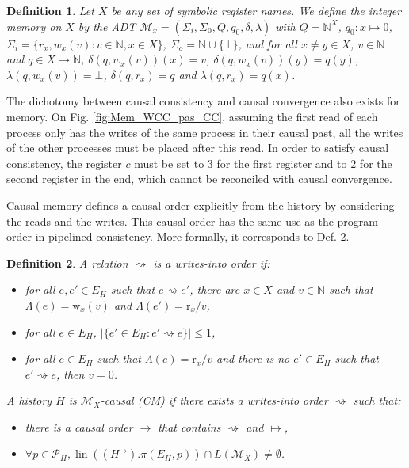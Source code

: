 \documentclass[9pt,numbers]{sigplanconf}
\newtheorem{definition}{Definition}
\DeclareMathOperator{\lin}{lin}
\begin{document}
\begin{definition}\label{def:mem}
  Let $X$ be any set of symbolic \emph{register names}. We define the integer \emph{memory} on $X$ by the ADT \linebreak
  $\mathcal{M}_x = (\Sigma_i, \Sigma_0, Q, q_0, \delta, \lambda)$ with $Q = \mathbb{N}^X$, $q_0 : x\mapsto 0$,
  $\Sigma_i = \{r_x, w_x(v) : v\in \mathbb{N}, x\in X\}$, 
  $\Sigma_o = \mathbb{N} \cup \{\bot\}$,  
  and for all $x\neq y\in X$, $v\in \mathbb{N}$ and $q\in X\rightarrow\mathbb{N}$,
  $\delta(q, w_x(v))(x) = v$, $\delta(q, w_x(v))(y) = q(y)$, $\lambda(q, w_x(v)) = \bot$, $\delta(q, r_x) = q$ and $\lambda(q, r_x) = q(x)$.
\end{definition}

The dichotomy between causal consistency and causal convergence also exists for memory. 
On Fig. \ref{fig:Mem_WCC_pas_CC}, assuming the first read of each process only has the writes of
the same process in their causal past, all the writes of the other processes must be placed after 
this read. In order to satisfy causal consistency, the register $c$ must be set to $3$ for the 
first register and to $2$ for the second register in the end, which cannot be reconciled with 
causal convergence.

Causal memory defines a causal order explicitly from the history by considering the reads and the writes. 
This causal order has the same use as the program order in pipelined consistency. More formally,
it corresponds to Def. \ref{def:CM}.

\begin{definition}\label{def:CM}
  A relation $\rightsquigarrow$ is a writes-into order if:
  \begin{itemize}
  \item for all $e, e'\in E_H$ such that $e \rightsquigarrow e'$, there are $x\in X$ and $v\in \mathbb{N}$ such that
    $\Lambda(e) = \mathrm{w}_x(v)$ and $\Lambda(e') = \mathrm{r}_x/v$,
  \item for all $e\in E_H$, $|\{e'\in E_H : e' \rightsquigarrow e\}| \le 1$,
  \item for all $e\in E_H$ such that $\Lambda(e) = \mathrm{r}_x/v$ and there is no $e'\in E_H$ such that $e'\rightsquigarrow e$,
    then $v = 0$.
  \end{itemize}
  A history $H$ is $\mathcal{M}_X$-\emph{causal} (CM) if there exists a writes-into order $\rightsquigarrow$ such that:
  \begin{itemize}
  \item there is a causal order $\rightarrow$ that contains $\rightsquigarrow$ and $\mapsto$,
  \item $\forall p\in \mathscr{P}_H, \lin\left((H^\rightarrow).\pi(E_H, p)\right) \cap L(\mathcal{M}_X) \neq \emptyset$.
  \end{itemize}
\end{definition}
\end{document}
